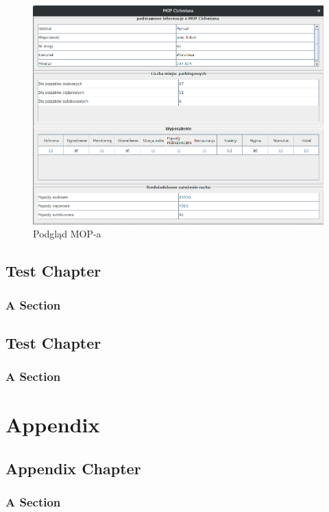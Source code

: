 \documentclass[10pt,paper=a4 BCOR0, DIV15]{scrbook} %
\begin{document}
      \begin{figure}[ht]
          \centering
          \includegraphics[width=.8\textwidth]{podglad_mopa.png}
          \caption{Podgląd MOP-a}
      \end{figure}

    \chapter{Test Chapter}
    \lipsum[1]

    \section{A Section}
    \lipsum[1]
    
    \chapter{Test Chapter}
    \lipsum[1]
    
    \section{A Section}
    \lipsum[1]

%	

    \appendix
    \cleardoublepage\part{Appendix}
    \chapter{Appendix Chapter}
    \lipsum[1]
    
    \section{A Section}
    \lipsum[1]
\end{document}
